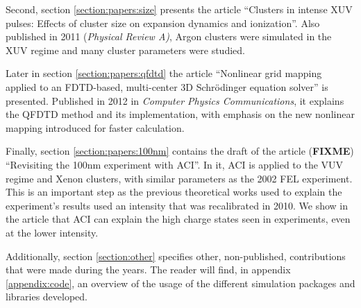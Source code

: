 Second, section \ref{section:papers:size} presents the article ``Clusters in
intense XUV pulses: Effects of cluster size on expansion dynamics and
ionization''. Also published in 2011 (\textit{Physical Review A)}, Argon
clusters were simulated in the XUV regime and many cluster parameters were
studied.

Later in section \ref{section:papers:qfdtd} the article ``Nonlinear grid mapping
applied to an FDTD-based, multi-center 3D Schr\"odinger equation solver'' is
presented. Published in 2012 in \textit{Computer Physics Communications}, it
explains the QFDTD method and its implementation, with emphasis on the new
nonlinear mapping introduced for faster calculation.

Finally, section \ref{section:papers:100nm} contains the draft of the article
(\textbf{FIXME}) ``Revisiting the 100nm experiment with ACI''. In it, ACI is
applied to the VUV regime and Xenon clusters, with similar parameters as the 2002
FEL experiment. This is an important step as the previous theoretical works
used to explain the experiment's results used an intensity that was
recalibrated in 2010. We show in the article that ACI can explain the high
charge states seen in experiments, even at the lower intensity.

Additionally, section \ref{section:other} specifies other, non-published,
contributions that were made during the years. The reader will find, in appendix
\ref{appendix:code}, an overview of the usage of the different simulation
packages and libraries developed.




